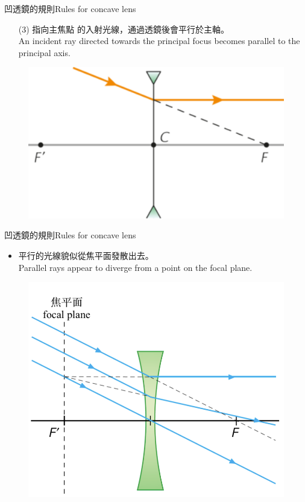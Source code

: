 \documentclass[beamer=true]{standalone}
\begin{document}
\begin{frame}{凹透鏡的規則Rules for concave lens}
    \begin{itemize}
        \item [(3)] 指向主焦點 的入射光線，通過透鏡後會平行於主軸。\\An incident ray directed towards the principal focus becomes parallel to the principal axis.
    \end{itemize}\bigskip
    \begin{figure}
        \centering
        \includegraphics[width=0.5\linewidth]{assets/d2dn902332ige.png}
    \end{figure}
\end{frame}

\begin{frame}{凹透鏡的規則Rules for concave lens}
    \begin{itemize}
        \item 平行的光線貌似從焦平面發散出去。\\Parallel rays appear to diverge from a point on the focal plane.
    \end{itemize}
    \begin{figure}
        \centering
        \includegraphics[width=0.65\linewidth]{assets/d0un209d2ungff.png}


    \end{figure}
\end{frame}
\end{document}
